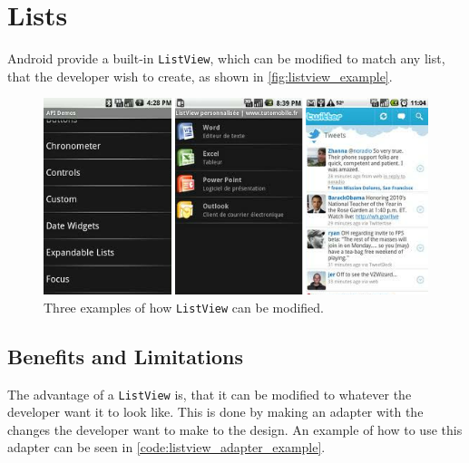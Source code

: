 \section{Lists}
Android provide a built-in \texttt{ListView}, which can be modified to match any list, that the developer wish to create, as shown in \autoref{fig:listview_example}.

\begin{figure}[H]
	\centering
		\includegraphics[width=\textwidth]{Images/Implementation/listview_example.png}
	\caption{Three examples of how \texttt{ListView} can be modified.}
	\label{fig:listview_example}
\end{figure}

\subsection{Benefits and Limitations}
The advantage of a \texttt{ListView} is, that it can be modified to whatever the developer want it to look like.
This is done by making an adapter with the changes the developer want to make to the design. An example of how to use this adapter can be seen in \autoref{code:listview_adapter_example}.

